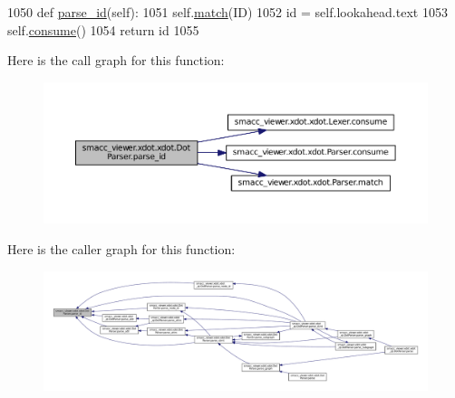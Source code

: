 \begin{DoxyCode}
1050     \textcolor{keyword}{def }\hyperlink{classsmacc__viewer_1_1xdot_1_1xdot_1_1DotParser_aec7bb154831d9a665fbd1a6b609dc340}{parse\_id}(self):
1051         self.\hyperlink{classsmacc__viewer_1_1xdot_1_1xdot_1_1Parser_acf6d95a1eaa50062589104985726ee90}{match}(ID)
1052         id = self.lookahead.text
1053         self.\hyperlink{classsmacc__viewer_1_1xdot_1_1xdot_1_1Parser_ab70715898a2ec0b51c6b333b73c78c37}{consume}()
1054         \textcolor{keywordflow}{return} id
1055 
\end{DoxyCode}


Here is the call graph for this function\+:
\nopagebreak
\begin{figure}[H]
\begin{center}
\leavevmode
\includegraphics[width=350pt]{classsmacc__viewer_1_1xdot_1_1xdot_1_1DotParser_aec7bb154831d9a665fbd1a6b609dc340_cgraph}
\end{center}
\end{figure}




Here is the caller graph for this function\+:
\nopagebreak
\begin{figure}[H]
\begin{center}
\leavevmode
\includegraphics[width=350pt]{classsmacc__viewer_1_1xdot_1_1xdot_1_1DotParser_aec7bb154831d9a665fbd1a6b609dc340_icgraph}
\end{center}
\end{figure}


